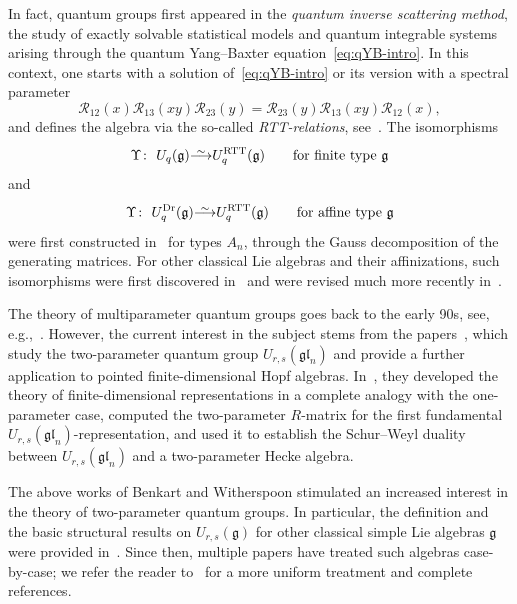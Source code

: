 \documentclass[10pt,a4paper]{amsart}
\numberwithin{equation}{section}
\newcommand{\fg}{\mathfrak{g}}
\newcommand{\gl}{\mathfrak{gl}}
\newcommand{\uu}{U_{r,s}(\fg)}
\newcommand\iso{ \vphantom{j^{X^2}}\smash{\overset{\sim}{\vphantom{\rule{0pt}{0.20em}}\smash{\longrightarrow}}} }
\begin{document}
In fact, quantum groups first appeared in the \emph{quantum inverse scattering method}, the study of exactly solvable statistical models and quantum integrable systems arising through the quantum Yang--Baxter equation~\eqref{eq:qYB-intro}. In this context, one starts with a solution of~\eqref{eq:qYB-intro} or its version with a spectral parameter
\begin{equation}\label{eq:qYB-affine-intro}
 \mathcal{R}_{12}(x)\mathcal{R}_{13}(xy)\mathcal{R}_{23}(y)=
 \mathcal{R}_{23}(y)\mathcal{R}_{13}(xy)\mathcal{R}_{12}(x),
\end{equation}
and defines the algebra \smash{$U^{\mathrm{RTT}}_q(\fg)$} via the so-called \emph{RTT-relations}, see~\cite{FRT}. The isomorphisms
\begin{equation}\label{eq:RTT-to-DJ-intro}
 \Upsilon\colon\ U_q(\fg) \iso U^{\mathrm{RTT}}_q(\fg)
 \qquad \text{for finite type}\ \fg
\end{equation}
and
\begin{equation}\label{eq:RTT-to-Dr-intro}
 \Upsilon\colon\ U^{\mathrm{Dr}}_q(\fg) \iso U^{\mathrm{RTT}}_q(\fg)
 \qquad \mathrm{for\ affine\ type}\ \fg
\end{equation}
were first constructed in~\cite{DF} for types $A_n$,  through the Gauss decomposition of the generating matrices. For other classical Lie algebras and their affinizations, such isomorphisms were first discovered in~\cite{HM} and were revised much more recently in~\cite{JLM2, JLM1}.

The theory of multiparameter quantum groups goes back to the early 90s, see, e.g.,~\mbox{\cite{AST,R,T}}. However, the current interest in the subject stems from the papers~\cite{BW2, BW3, BW1},
which study the two-parameter quantum group $U_{r,s}(\gl_n)$ and provide a further application to pointed finite-dimensional Hopf algebras. In~\cite{BW2}, they developed the theory of finite-dimensional representations in a complete analogy with the one-parameter case, computed the two-parameter $R$-matrix for the first fundamental $U_{r,s}(\gl_n)$-representation, and used it to establish the Schur--Weyl duality between $U_{r,s}(\gl_n)$ and a two-parameter Hecke algebra.

The above works of Benkart and Witherspoon stimulated an increased interest in the theory of two-parameter quantum groups. In particular, the definition and the basic structural results on $\uu$ for other classical simple Lie algebras $\fg$ were provided in~\cite{BGH1,BGH2}. Since then, multiple papers have treated such algebras case-by-case; we refer the reader to~\cite{HP} for a more uniform treatment and complete references.
\end{document}
